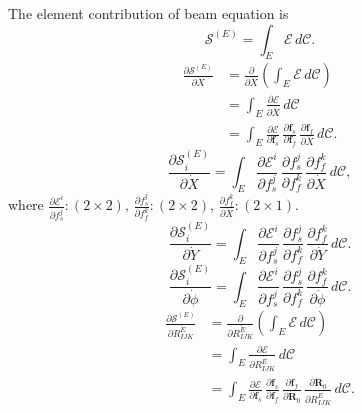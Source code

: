 \documentclass[a4paper,12pt]{article}
\begin{document}
The element contribution of beam equation is 
\begin{equation}
	\label{eqn:146}
	\bm{\mathcal{S}}^{(E)}=\int_E \bm{\mathcal{E}}\,d\mathcal{C}.
\end{equation}
\begin{equation}
	\label{eqn:147}
	\begin{aligned}
	\frac{\partial \bm{\mathcal{S}}^{(E)}}{\partial \dot{X}}&=\frac{\partial}{\partial \dot{X}}\left(\int_E\bm{\mathcal{E}}\,d\mathcal{C}\right)\\
	&=\int_E\frac{\partial \bm{\mathcal{E}}}{\partial \dot{X}}\,d\mathcal{C}\\
	&=\int_E\frac{\partial \bm{\mathcal{E}}}{\partial \bm{f}_s}\,\frac{\partial \bm{f}_s}{\partial \bm{f}_f}\,\frac{\partial \bm{f}_f}{\partial \dot{X}}\,d\mathcal{C}.
    \end{aligned}
\end{equation}
\begin{equation}
	\label{eqn:148}
	\frac{\partial \mathcal{S}_i^{(E)}}{\partial \dot{X}}=\int_E\frac{\partial \mathcal{E}^i}{\partial f^j_s}\,\frac{\partial f^j_s}{\partial f^k_f}\,\frac{\partial f^k_f}{\partial \dot{X}}\,d\mathcal{C},
\end{equation}
where $\frac{\partial \mathcal{E}^i}{\partial f^j_s}:(2\times2),\,\frac{\partial f^j_s}{\partial f^k_f}:(2\times2),\, \frac{\partial f^k_f}{\partial \dot{X}}:(2\times 1)$.
\begin{equation}
	\label{eqn:149}
	\frac{\partial \mathcal{S}_i^{(E)}}{\partial \dot{Y}}=\int_E\frac{\partial \mathcal{E}^i}{\partial f^j_s}\,\frac{\partial f^j_s}{\partial f^k_f}\,\frac{\partial f^k_f}{\partial \dot{Y}}\,d\mathcal{C}.
\end{equation}
\begin{equation}
	\label{eqn:150}
	\frac{\partial \mathcal{S}_i^{(E)}}{\partial \dot{\phi}}=\int_E\frac{\partial \mathcal{E}^i}{\partial f^j_s}\,\frac{\partial f^j_s}{\partial f^k_f}\,\frac{\partial f^k_f}{\partial \dot{\phi}}\,d\mathcal{C}.
\end{equation}
\begin{equation}
	\label{eqn:151}
	\begin{aligned}
		\frac{\partial \bm{\mathcal{S}}^{(E)}}{\partial \dot{R_{IJK}^{E}}}&=\frac{\partial}{\partial \dot{R_{IJK}^{E}}}\left(\int_E\bm{\mathcal{E}}\,d\mathcal{C}\right)\\
		&=\int_E\frac{\partial \bm{\mathcal{E}}}{\partial \dot{R_{IJK}^{E}}}\,d\mathcal{C}\\
		&=\int_E\frac{\partial \bm{\mathcal{E}}}{\partial \bm{f}_s}\,\frac{\partial \bm{f}_s}{\partial \bm{f}_f}\,\frac{\partial \bm{f}_f}{\partial \dot{\bm{R}}_0}\,\frac{\partial \dot{\bm{R}}_0}{\partial \dot{R_{IJK}^{E}}}\,d\mathcal{C}.
	\end{aligned}
\end{equation}
\end{document}
